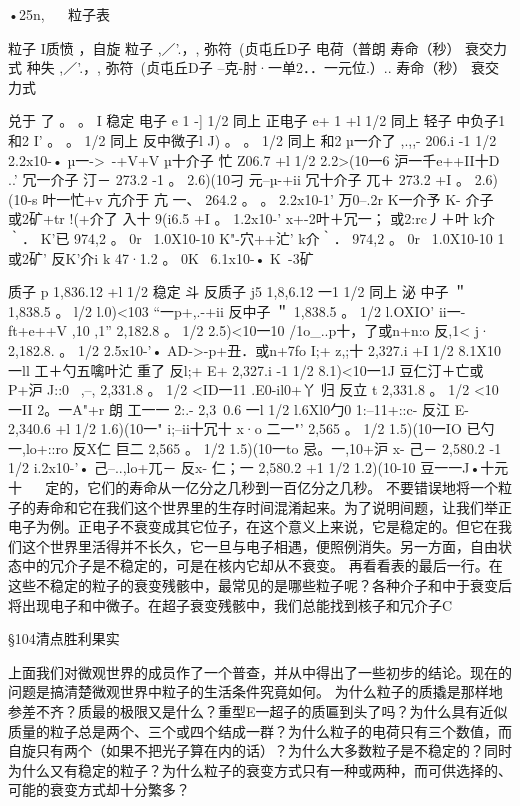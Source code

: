 •25n,
  
粒子表

粒子			I质愤		，自旋		
粒子
	,／'.，,	弥符~(贞屯丘D子	电荷（普朗	寿命（秒）	衰交力式
种失	,／'.，,
	弥符~(贞屯丘D子
	--克-肘·一单2．．一元位.）..	寿命（秒）
	衰交力式

	兑于	了	。	。	I	稳定	
	电子	e	1	-]	1/2	同上	
	正电子	e+	1	+l	1/2	同上	
轻子	中负子1和2	I'	。	。	1/2	同上	
	反中微子l	J)		。	。	1/2	同上	
	和2							
	µ一介了	,.,,-	206.i	-1	1/2	2.2x10-•	µ一->~-+V+V
	µ十介子	忙	Z06.7	+l	1/2	2.2>(10一6	沪一千e++II十D
					..'			
	冗一介子	汀－	273.2	-1	。	2.6)(10刁	元--µ-+ii
	冗十介子	兀＋	273.2	+I	。	2.6)(10-s	叶一忙+v
	亢介于	亢	一、	264.2	。	。	2.2x10-1'	万0--.2r
	K一介予	K-	%
介子									或2矿+tr
	!(+介了	入十	9(i6.5	+I	。	1.2x10-'	x+-2叶＋冗一；
									或2:rc丿＋叶
	k介｀．	K'已	974,2	。	0r~	1.0X10-10	K"-穴++汒'
	k介｀．
			974,2
	。
	0r~
	1.0X10-10
	1或2矿'
	反K'介i	k	47·1.2	。	0K~	6.1x10-•	K~-3矿
									
	质子	p	1,836.12	+l	1/2	稳定	
斗	反质子	j5	1,8,6.12	一1	1/2	同上	
泌	中子	＂	1,838.5	。	l/2	l.0)<103	“一p+,.-+ii
	反中子	＂	1,838.5	。	1/2	l.OXIO'	ii一-ft+e++V
	,10	,1''	2,182.8	。	1/2	2.5)<10一10	/1o_..p十，了或n+n:o
	反,1<	j·	2,182.8.	。	1/2	2.5x10-'•	AD->-p+丑．或n+7fo
	I;+	z,;十	2,327.i	+I	1/2	8.1X10一ll	工＋勺五噙叶汒
重了	反l;+	E+	2,327.i	-1	1/2	8.1)<10一1J	豆仁汀＋亡或P+沪
	J::0	~,--,	2,331.8	。	1/2	<ID一11	.E0-il0+丫
归	反立	t		2,331.8	。	1/2	<10一II	2。一A"+r
朗	工一一	2:.-	2,3~0.6	一l	1/2	l.6Xl0勹0	1:--11+::c-
	反江	E-	2,340.6	+l	1/2	1.6)(10一"	i;--ii十冗十
	x·o	二一"'	2,565	。	1/2	1.5)(10一IO	已勺一,lo+::ro
	反X仁	巨二	2,565	。	1/2	1.5)(10一to	忌。一,10+沪
	x-	己－	2,580.2	-1	1/2	i.2x10-'•	己--..,lo+兀－
	反x-	仁；一	2,580.2	+1	1/2	1.2)(10-10	豆一一J•十元十
  
定的，它们的寿命从一亿分之几秒到一百亿分之几秒。
不要错误地将一个粒子的寿命和它在我们这个世界里的生存时间混淆起来。为了说明间题，让我们举正电子为例。正电子不衰变成其它位子，在这个意义上来说，它是稳定的。但它在我们这个世界里活得并不长久，它一旦与电子相遇，便照例消失。另一方面，自由状态中的冗介子是不稳定的，可是在核内它却从不衰变。
再看看表的最后一行。在这些不稳定的粒子的衰变残骸中，最常见的是哪些粒子呢？各种介子和中于衰变后将出现电子和中微子。在超子衰变残骸中，我们总能找到核子和冗介子C

§104清点胜利果实

上面我们对微观世界的成员作了一个普查，并从中得出了一些初步的结论。现在的问题是搞清楚微观世界中粒子的生活条件究竟如何。
为什么粒子的质撬是那样地参差不齐？质最的极限又是什么？重型E一超子的质匾到头了吗？为什么具有近似质量的粒子总是两个、三个或四个结成一群？为什么粒子的电荷只有三个数值，而自旋只有两个（如果不把光子算在内的话）？为什么大多数粒子是不稳定的？同时为什么又有稳定的粒子？为什么粒子的衰变方式只有一种或两种，而可供选择的、可能的衰变方式却十分繁多？

